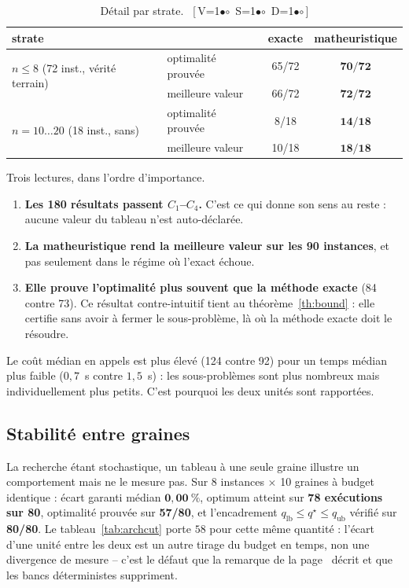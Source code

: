 \documentclass[11pt,a4paper]{article}
\theoremstyle{plain}
\theoremstyle{remark}
\newcommand{\qs}{q^{\star}}
\newcommand{\cfgm}[1]{\ifnum#1=1$\bullet$\else$\circ$\fi}
\newcommand{\conf}[3]{%
  \textsf{\footnotesize[\,V\cfgm{#1}\ S\cfgm{#2}\ D\cfgm{#3}\,]}}
\begin{document}
\begin{table}[H]
\centering
\caption{Détail par strate.\ \conf{0}{0}{0}}
\begin{tabular}{llcc}
\toprule
strate & & exacte & matheuristique\\
\midrule
\multirow{2}{*}{$n\le 8$ (72 inst., vérité terrain)}
 & optimalité prouvée & 65/72 & $\mathbf{70/72}$\\
 & meilleure valeur & 66/72 & $\mathbf{72/72}$\\
\midrule
\multirow{2}{*}{$n=10\dots20$ (18 inst., sans)}
 & optimalité prouvée & 8/18 & $\mathbf{14/18}$\\
 & meilleure valeur & 10/18 & $\mathbf{18/18}$\\
\bottomrule
\end{tabular}
\end{table}

\noindent
Trois lectures, dans l'ordre d'importance.
\begin{enumerate}[leftmargin=*,itemsep=2pt]
\item \textbf{Les 180 résultats passent $C_1$--$C_4$.} C'est ce qui donne son
      sens au reste : aucune valeur du tableau n'est auto-déclarée.
\item \textbf{La matheuristique rend la meilleure valeur sur les 90
      instances}, et pas seulement dans le régime où l'exact échoue.
\item \textbf{Elle prouve l'optimalité plus souvent que la méthode exacte}
      (84 contre 73). Ce résultat contre-intuitif tient au
      théorème~\ref{th:bound} : elle certifie sans avoir à fermer le
      sous-problème, là où la méthode exacte doit le résoudre.
\end{enumerate}
Le coût médian en appels est plus élevé (124 contre 92) pour un temps médian
plus faible ($0{,}7$~s contre $1{,}5$~s) : les sous-problèmes sont plus
nombreux mais individuellement plus petits. C'est pourquoi les deux unités
sont rapportées.

\subsection{Stabilité entre graines}

La recherche étant stochastique, un tableau à une seule graine illustre un
comportement mais ne le mesure pas. Sur 8 instances $\times$ 10 graines à
budget identique : écart garanti médian $\mathbf{0{,}00\ \%}$, optimum
atteint sur \textbf{78 exécutions sur 80}, optimalité prouvée sur
\textbf{57/80}, et l'encadrement $q_{\text{lb}}\le\qs\le q_{\text{ub}}$
vérifié sur \textbf{80/80}. Le tableau~\ref{tab:archcut} porte $58$ pour
cette même quantité : l'écart d'une unité entre les deux est un autre
tirage du budget en temps, non une divergence de mesure -- c'est le défaut
que la remarque de la page~\pageref{tab:archcut} décrit et que les bancs
déterministes suppriment.
\end{document}
